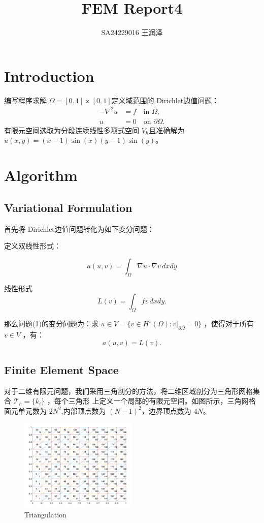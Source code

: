 \documentclass[11pt]{ctexart}
\title{FEM Report4}
\author{SA24229016 王润泽}
\begin{document}
\maketitle

\section{Introduction}
编写程序求解 $ \Omega=[0,1]\times [0,1] $定义域范围的 Dirichlet边值问题：
\begin{equation}
     \begin{aligned}
         -\nabla^2 u &= f \quad \text{in } \Omega, \\
         u &= 0 \quad \text{on } \partial \Omega.
     \end{aligned}
\end{equation}
有限元空间选取为分段连续线性多项式空间 $ V_h $且准确解为 $ u(x,y) = (x-1)\sin(x)(y-1)\sin(y) $。

\section{Algorithm}

\subsection{Variational Formulation}
首先将 Dirichlet边值问题转化为如下变分问题：

定义双线性形式：

$$ a(u,v) = \int_{\Omega} \nabla u \cdot \nabla v \, dx dy $$ 

线性形式 
$$ L(v) = \int_{\Omega} f v \, dx dy .$$

那么问题(1)的变分问题为：求 $ u \in V = \{ v \in H^1(\Omega) : v|_{\partial \Omega} = 0 \} $ ，使得对于所有 $ v \in V $ ，有：
\begin{equation}
     a(u,v) = L(v).
\end{equation}

\subsection{Finite Element Space}

对于二维有限元问题，我们采用三角剖分的方法，将二维区域剖分为三角形网格集合 $ \mathcal{T}_h=\{k_i\} $ ，每个三角形 上定义一个局部的有限元空间。如图所示，三角网格面元单元数为 $ 2N^2 $,内部顶点数为 $ (N-1)^2 $，边界顶点数为 $ 4N$。
\begin{figure}[htbp]
      \centering
      \includegraphics[width=0.5\textwidth]{triangulation.png}
      \caption{Triangulation}
      \label{fig:triangulation}
\end{figure}
\end{document}
